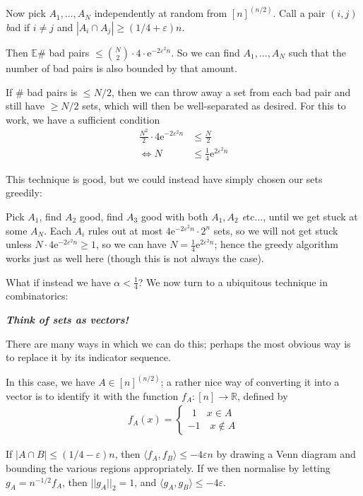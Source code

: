 \documentclass[]{article}
\theoremstyle{custhm}
\theoremstyle{cusdef}
\theoremstyle{custhm}
\theoremstyle{custhm}
\theoremstyle{custhm}
\theoremstyle{custhm}
\theoremstyle{cusdef}
\theoremstyle{remark}
\newcommand{\R}{\mathbb{R}}
\newcommand{\e}{\mathrm{e}}
\newcommand{\ra}{\rightarrow}
\newcommand{\eps}{\varepsilon}
\newcommand{\E}{\mathbb{E}}
\newcommand{\undf}[1]{\textit{\textbf{#1}}}
\renewcommand{\it}[1]{\textit{#1}}
\begin{document}
Now pick $A_1,\dots,A_N$ independently at random from $[n]^{(n/2)}$. Call a pair $(i,j)$ {\it bad} if $i\ne j$ and $|A_i\cap A_j| \ge (1/4+\eps)n$.

Then $\E$\# bad pairs $\le \binom{N}{2}\cdot 4\cdot \e^{-2\eps^2 n}$. So we can find $A_1,\dots,A_N$ such that the number of bad pairs is also bounded by that amount.

If \# bad pairs is $\le N/2$, then we can throw away a set from each bad pair and still have $\ge N/2$ sets, which will then be well-separated as desired. For this to work, we have a sufficient condition
\begin{align*}
	\frac{N^2}{2}\cdot 4\e^{-2\eps^2n}&\le \frac{N}{2}\\
\iff N &\le \frac{1}{4}\e^{2\eps^2 n}
\end{align*}

This technique is good, but we could instead have simply chosen our sets greedily:

Pick $A_1$, find $A_2$ good, find $A_3$ good with both $A_1,A_2$ {\it etc...}, until we get stuck at some $A_N$. Each $A_i$ rules out at most $4\e^{-2\eps^2n}\cdot 2^n$ sets, so we will not get stuck unless $N\cdot 4\e^{-2\eps^2 n} \ge 1$, so we can have $N = \frac{1}{4}\e^{2\eps^2n}$; hence the greedy algorithm works just as well here (though this is not always the case).

What if instead we have $\alpha < \frac{1}{4}$? We now turn to a ubiquitous technique in combinatorics:

\undf{Think of sets as vectors!}

There are many ways in which we can do this; perhaps the most obvious way is to replace it by its indicator sequence.

In this case, we have $A \in [n]^{(n/2)}$; a rather nice way of converting it into a vector is to identify it with the function $f_A: [n]\ra\R$, defined by
\begin{align*}
	f_A(x) = \left\lbrace \begin{array}{c}\ \ 1\quad x\in A\\ -1\quad x\not\in A\end{array}\right.
\end{align*}

If $|A\cap B| \le (1/4 - \eps)n$, then $\langle f_A,f_B\rangle \le -4\eps n$ by drawing a Venn diagram and bounding the various regions appropriately. If we then normalise by letting $g_A = n^{-1/2}f_A$, then $||g_A||_2 = 1$, and $\langle g_A,g_B\rangle \le -4\eps$.
\end{document}
